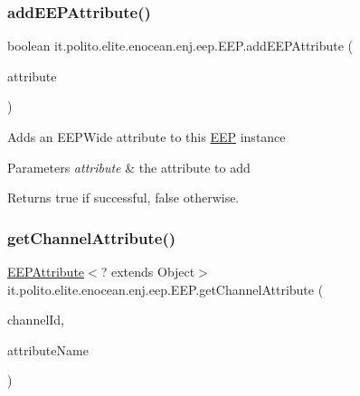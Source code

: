 \subsubsection{\texorpdfstring{add\+E\+E\+P\+Attribute()}{addEEPAttribute()}}
{\footnotesize\ttfamily boolean it.\+polito.\+elite.\+enocean.\+enj.\+eep.\+E\+E\+P.\+add\+E\+E\+P\+Attribute (\begin{DoxyParamCaption}\item[{\hyperlink{classit_1_1polito_1_1elite_1_1enocean_1_1enj_1_1eep_1_1_e_e_p_attribute}{E\+E\+P\+Attribute}$<$? extends Object $>$}]{attribute }\end{DoxyParamCaption})}

Adds an E\+E\+P\+Wide attribute to this \hyperlink{classit_1_1polito_1_1elite_1_1enocean_1_1enj_1_1eep_1_1_e_e_p}{E\+EP} instance


\begin{DoxyParams}{Parameters}
{\em attribute} & the attribute to add \\
\hline
\end{DoxyParams}
\begin{DoxyReturn}{Returns}
true if successful, false otherwise. 
\end{DoxyReturn}
\hypertarget{classit_1_1polito_1_1elite_1_1enocean_1_1enj_1_1eep_1_1_e_e_p_a5cfe75240487b93a55ef364071cb2bc4}{}\label{classit_1_1polito_1_1elite_1_1enocean_1_1enj_1_1eep_1_1_e_e_p_a5cfe75240487b93a55ef364071cb2bc4} 
\subsubsection{\texorpdfstring{get\+Channel\+Attribute()}{getChannelAttribute()}}
{\footnotesize\ttfamily \hyperlink{classit_1_1polito_1_1elite_1_1enocean_1_1enj_1_1eep_1_1_e_e_p_attribute}{E\+E\+P\+Attribute}$<$? extends Object$>$ it.\+polito.\+elite.\+enocean.\+enj.\+eep.\+E\+E\+P.\+get\+Channel\+Attribute (\begin{DoxyParamCaption}\item[{Integer}]{channel\+Id,  }\item[{String}]{attribute\+Name }\end{DoxyParamCaption})}

